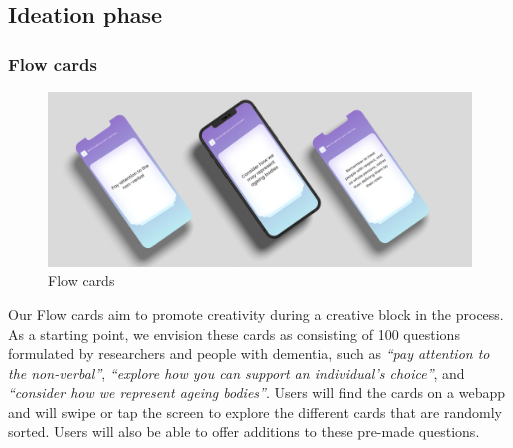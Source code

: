 \subsection{Ideation phase}
\subsubsection{Flow cards}
\begin{figure}[h]
\centering
\includegraphics[width=1\linewidth]{Images/D3Toolkit/Fig8.png}
\caption{Flow cards}
\label{fig:FlowCards}
\end{figure}
Our Flow cards aim to promote creativity during a creative block in the process. As a starting point, we envision these cards as consisting of 100 questions formulated by researchers and people with dementia, such as \textit{“pay attention to the non-verbal”}, \textit{“explore how you can support an individual’s choice”}, and \textit{“consider how we represent ageing bodies”}. Users will find the cards on a webapp and will swipe or tap the screen to explore the different cards that are randomly sorted. Users will also be able to offer additions to these pre-made questions. 

